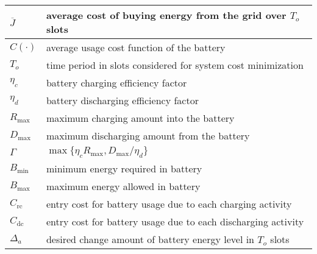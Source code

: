 \documentclass[journal]{IEEEtran}
\begin{document}
\begin{table}[t]
\begin{tabular}{p{0.7cm}| p{7.1cm}}
\hline
$\overline{J}$ & average cost of buying energy from the grid over $T_o$ slots \\
\hline
$C(\cdot)$ & average usage cost function  of the battery\\
\hline
$T_o$ & time period in slots considered for system cost minimization \\
\hline
$\eta_c$ & battery charging efficiency factor\\
\hline
$\eta_d$ & battery discharging efficiency factor\\
\hline
$R_{\max}$ & maximum charging amount into the battery\\
\hline
$D_{\max}$ & maximum discharging amount from the battery\\
\hline
$\Gamma$ & $\max\{\eta_cR_{\max},D_{\max}/\eta_d\}$ \\
\hline
$B_{\min}$ & minimum energy required in battery\\
\hline
$B_{\max}$ & maximum energy allowed in battery\\
\hline
$C_{\textrm{rc}}$ & entry cost for battery usage due to each charging activity\\
\hline
$C_{\textrm{dc}}$ & entry cost for battery usage due to each discharging activity\\
\hline
$\Delta_a$ & desired change amount of battery energy level in $T_o$ slots\\
\hline\hline
\end{tabular}
\end{table}
\end{document}
